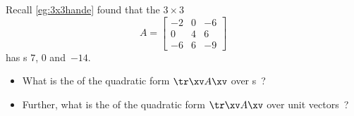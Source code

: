 \begin{activity}
Recall \autoref{eg:3x3hande} found that the \(3\times3\) 
\begin{equation*}
A=\begin{bmatrix} -2&0&-6\\0&4&6\\-6&6&-9 \end{bmatrix}
\end{equation*}
has s \(7\), \(0\) and~\(-14\).
\begin{itemize}
\item What is the  of the quadratic form \(\tr\xv A\xv\) over s~\xv?
\item Further, what is the  of the quadratic form \(\tr\xv A\xv\) over unit vectors~\xv?
\end{itemize}
\end{activity}



\begin{comment}
Could define positive/negative semi-definite forms/matrices.
But seems incidental so do not write yet.
\end{comment}




\begin{comment} \label{ex:} 
Could have an optional application section on the following problem: useful whenever we can assess any pair of items, but do not have a framework for their absolute position.
Find \(m\) points in \(n\)D given that you know their distance
matrix and given that the mean location is precisely zero
\cite[p.83]{Hopcroft2014}. 
See \verb|multiDscaling.m|
\end{comment}







\sectionExercises


